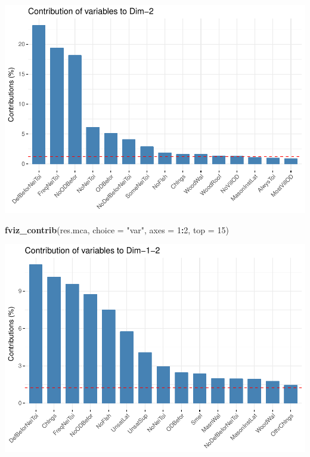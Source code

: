\documentclass[11pt,]{article}
\newenvironment{Shaded}{\begin{snugshade}}{\end{snugshade}}
\newcommand{\DataTypeTok}[1]{\textcolor[rgb]{0.13,0.29,0.53}{#1}}
\newcommand{\DecValTok}[1]{\textcolor[rgb]{0.00,0.00,0.81}{#1}}
\newcommand{\KeywordTok}[1]{\textcolor[rgb]{0.13,0.29,0.53}{\textbf{#1}}}
\newcommand{\NormalTok}[1]{#1}
\newcommand{\OperatorTok}[1]{\textcolor[rgb]{0.81,0.36,0.00}{\textbf{#1}}}
\newcommand{\OtherTok}[1]{\textcolor[rgb]{0.56,0.35,0.01}{#1}}
\newcommand{\StringTok}[1]{\textcolor[rgb]{0.31,0.60,0.02}{#1}}
\begin{document}
\includegraphics{describe_FSMintentions_regional_seasonal_iDE-Camb_surveysOct2017_files/figure-latex/MCA_results-11.pdf}

\begin{Shaded}
\begin{Highlighting}[]
\KeywordTok{fviz_contrib}\NormalTok{(res.mca, }\DataTypeTok{choice =} \StringTok{"var"}\NormalTok{, }\DataTypeTok{axes =} \DecValTok{1}\OperatorTok{:}\DecValTok{2}\NormalTok{, }\DataTypeTok{top =} \DecValTok{15}\NormalTok{)}
\end{Highlighting}
\end{Shaded}

\includegraphics{describe_FSMintentions_regional_seasonal_iDE-Camb_surveysOct2017_files/figure-latex/MCA_results-12.pdf}

\begin{Shaded}
\end{Shaded}
\end{document}
